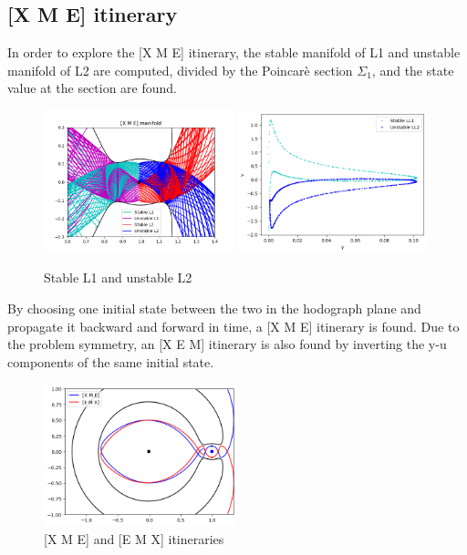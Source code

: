 \documentclass{report}
\begin{document}
\subsection*{[X M E] itinerary}
In order to explore the [X M E] itinerary, the stable manifold of L1 and unstable manifold of L2 are computed, 
divided by the Poincarè section $\Sigma_1$, and the state value at the section are found. 
\begin{figure}[h]
    \centering
    \includegraphics[width=0.49\textwidth]{images/manifold_XME.png}
    \includegraphics[width=0.49\textwidth]{images/XME_yv.png}
    \caption{Stable L1 and unstable L2}
\end{figure}
By choosing one initial state between the two in the hodograph plane and propagate it backward and forward in time, 
a [X M E] itinerary is found. Due to the problem symmetry, an [X E M] itinerary is also found by inverting the y-u components of the same initial state.
\begin{figure}[h]
    \centering
    \includegraphics[width=0.5\textwidth]{images/XME_traj.png}
    \caption{[X M E] and [E M X] itineraries}
\end{figure}
\newpage
\end{document}

